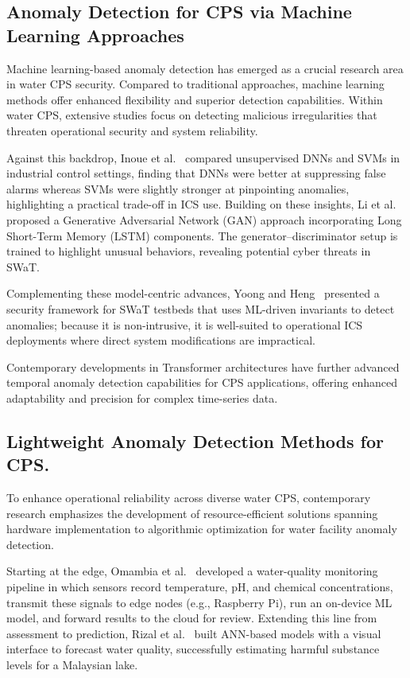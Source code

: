 \documentclass[pdflatex,sn-mathphys-num]{sn-jnl}%
\theoremstyle{thmstyleone}
\theoremstyle{thmstyletwo}%
\theoremstyle{thmstylethree}%
\begin{document}
\subsection{Anomaly Detection for CPS via Machine Learning Approaches}\label{related: ML}
Machine learning-based anomaly detection has emerged as a crucial research area in water CPS security. Compared to traditional approaches, machine learning methods offer enhanced flexibility and superior detection capabilities. Within water CPS, extensive studies focus on detecting malicious irregularities that threaten operational security and system reliability.

Against this backdrop, Inoue et al.~\cite{inoue2017anomaly} compared unsupervised DNNs and SVMs in industrial control settings, finding that DNNs were better at suppressing false alarms whereas SVMs were slightly stronger at pinpointing anomalies, highlighting a practical trade-off in ICS use.
Building on these insights, Li et al.~\cite{li2019mad} proposed a Generative Adversarial Network (GAN) approach incorporating Long Short-Term Memory (LSTM) components. The generator--discriminator setup is trained to highlight unusual behaviors, revealing potential cyber threats in SWaT.

Complementing these model-centric advances, Yoong and Heng~\cite{yoong2019framework} presented a security framework for SWaT testbeds that uses ML-driven invariants to detect anomalies; because it is non-intrusive, it is well-suited to operational ICS deployments where direct system modifications are impractical.

Contemporary developments in Transformer architectures have further advanced temporal anomaly detection capabilities for CPS applications, offering enhanced adaptability and precision for complex time-series data.

\subsection{Lightweight Anomaly Detection Methods for CPS.}\label{related: LightWeight}   %
To enhance operational reliability across diverse water CPS, contemporary research emphasizes the development of resource-efficient solutions spanning hardware implementation to algorithmic optimization for water facility anomaly detection.

Starting at the edge, Omambia et al.~\cite{omambia2022water} developed a water-quality monitoring pipeline in which sensors record temperature, pH, and chemical concentrations, transmit these signals to edge nodes (e.g., Raspberry Pi), run an on-device ML model, and forward results to the cloud for review.
Extending this line from assessment to prediction, Rizal et al.~\cite{rizal2022water} built ANN-based models with a visual interface to forecast water quality, successfully estimating harmful substance levels for a Malaysian lake.
\end{document}
